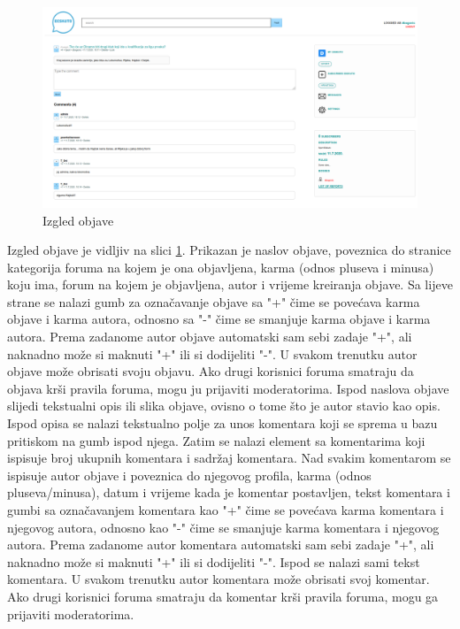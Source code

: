 \documentclass{foi}
\begin{document}
\begin{figure}[h!]
    \centering
    \includegraphics[width=1\textwidth]{slike/objava.png}
    \caption{Izgled objave}
    \label{objava}
\end{figure}

Izgled objave je vidljiv na slici \ref{objava}. Prikazan je naslov objave, poveznica do stranice kategorija foruma na kojem je ona objavljena, karma (odnos pluseva i minusa) koju ima, forum na kojem je objavljena, autor i vrijeme kreiranja objave. Sa lijeve strane se nalazi gumb za označavanje objave sa "+" čime se povećava karma objave i karma autora, odnosno sa "-" čime se smanjuje karma objave i karma autora. Prema zadanome autor objave automatski sam sebi zadaje "+", ali naknadno može si maknuti "+" ili si dodijeliti "-". U svakom trenutku autor objave može obrisati svoju objavu. Ako drugi korisnici foruma smatraju da objava krši pravila foruma, mogu ju prijaviti moderatorima. Ispod naslova objave slijedi tekstualni opis ili slika objave, ovisno o tome što je autor stavio kao opis. Ispod opisa se nalazi tekstualno polje za unos komentara koji se sprema u bazu pritiskom na gumb ispod njega. Zatim se nalazi element sa komentarima koji ispisuje broj ukupnih komentara i sadržaj komentara. Nad svakim komentarom se ispisuje autor objave i poveznica do njegovog profila, karma (odnos pluseva/minusa), datum i vrijeme kada je komentar postavljen, tekst komentara i gumbi sa označavanjem komentara kao "+" čime se povećava karma komentara i njegovog autora, odnosno kao "-" čime se smanjuje karma komentara i njegovog autora. Prema zadanome autor komentara automatski sam sebi zadaje "+", ali naknadno može si maknuti "+" ili si dodijeliti "-". Ispod se nalazi sami tekst komentara. U svakom trenutku autor komentara može obrisati svoj komentar. Ako drugi korisnici foruma smatraju da komentar krši pravila foruma, mogu ga prijaviti moderatorima.
\end{document}
